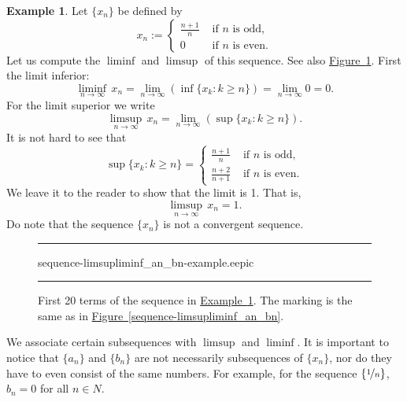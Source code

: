 \documentclass[12pt]{book}
\newenvironment{myfigureht}{%
\begin{figure}[h!t]
\noindent\rule{\textwidth}{0.4pt}\vspace{12pt}\par\centering}%
{\par\noindent\rule{\textwidth}{0.4pt}
\end{figure}}
\theoremstyle{plain}
\theoremstyle{remark}
\theoremstyle{definition}
\theoremstyle{exercise}
\theoremstyle{example}
\newtheorem{example}[thm]{Example}
\newcommand{\figureref}[1]{\hyperref[#1]{Figure~\ref*{#1}}}
\newcommand{\exampleref}[1]{\hyperref[#1]{Example~\ref*{#1}}}
\begin{document}
\begin{example} \label{example:liminfsupex}
Let $\{ x_n \}$ be defined by
\begin{equation*}
x_n :=
\begin{cases}
\frac{n+1}{n} & \text{ if $n$ is odd,} \\
0 & \text{ if $n$ is even.}
\end{cases}
\end{equation*}
Let us compute the $\liminf$ and $\limsup$ of this sequence.  See also
\figureref{sequence-limsupliminf_an_bn-example}.  First the
limit inferior:
\begin{equation*}
\liminf_{n\to\infty} \, x_n = 
\lim_{n\to\infty}
\left(
\inf \{ x_k : k \geq n \}
\right)
=
\lim_{n\to\infty} 0 = 0 .
\end{equation*}
For the limit superior we write
\begin{equation*}
\limsup_{n\to\infty} \, x_n = 
\lim_{n\to\infty}
\left(
\sup \{ x_k : k \geq n \}
\right) .
\end{equation*}
It is not hard to see that
\begin{equation*}
\sup \{ x_k : k \geq n \} =
\begin{cases}
\frac{n+1}{n} & \text{ if $n$ is odd,} \\
\frac{n+2}{n+1} & \text{ if $n$ is even.}
\end{cases}
\end{equation*}
We leave it to the reader to show that the limit is 1.  That is,
\begin{equation*}
\limsup_{n\to\infty} \, x_n = 1 .
\end{equation*}
Do note that the sequence $\{ x_n \}$ is not a convergent sequence.
\begin{myfigureht}
{sequence-limsupliminf_an_bn-example.eepic}
\caption{First 20 terms of the sequence in \exampleref{example:liminfsupex}.
The marking is the same as in \figureref{sequence-limsupliminf_an_bn}.
\label{sequence-limsupliminf_an_bn-example}}
\end{myfigureht}
\end{example}

We associate certain subsequences with $\limsup$ and $\liminf$.
It is important to notice that $\{ a_n \}$ and $\{ b_n \}$ are not
necessarily subsequences of $\{ x_n \}$, nor do they have to even 
consist of the same numbers.
For example, for the sequence $\{ \nicefrac{1}{n} \}$,
$b_n = 0$ for all $n \in N$.
\end{document}
